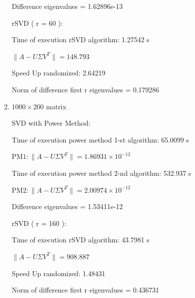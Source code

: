 \documentclass{article}
\begin{document}
\begin{enumerate}
Difference eigenvalues = 1.62896e-13

\vspace{\baselineskip}
rSVD ( r = 60 ):

Time of execution rSVD algorithm: 1.27542 s

\(\| A - U \Sigma V^T \| = 148.793 \)

Speed Up randomized: 2.64219

Norm of difference first r eigenvalues = 0.179286

\vspace{\baselineskip}
\item $1000 \times 200$ matrix

SVD with Power Method:

Time of execution power method 1-st algorithm: 65.0099 s

\( \text{PM1} : \| A - U \Sigma V^T \| = 1.86931 \times 10^{-12} \)

Time of execution power method 2-nd algorithm: 532.937 s

\( \text{PM2} : \| A - U \Sigma V^T \| = 2.00974 \times 10^{-12} \)

Difference eigenvalues = 1.53411e-12

\vspace{\baselineskip}
rSVD ( r = 160 ):

Time of execution rSVD algorithm: 43.7981 s

\(\| A - U \Sigma V^T \| = 908.887 \)

Speed Up randomized: 1.48431

Norm of difference first r eigenvalues = 0.436731
\end{enumerate}
\vspace{\baselineskip}
\end{document}
